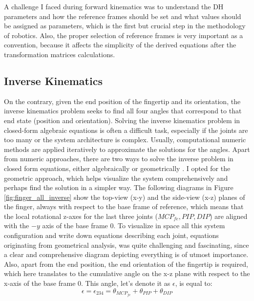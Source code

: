 \documentclass[a4paper,12pt]{article}
\begin{document}
A challenge I faced during forward kinematics was to understand the DH parameters and how the reference frames should be set and what values should be assigned as parameters, which is the first but crucial step in the methodology of robotics. Also, the proper selection of reference frames is very important as a convention, because it affects the simplicity of the derived equations after the transformation matrices calculations.


\subsection{Inverse Kinematics}
On the contrary, given the end position of the fingertip and its orientation, the inverse kinematics problem seeks to find all four angles that correspond to that end state (position and orientation). Solving the inverse kinematics problem in closed-form algebraic equations is often a difficult task, especially if the joints are too many or the system architecture is complex. Usually, computational numeric methods are applied iteratively to approximate the solutions for the angles. Apart from numeric approaches, there are two ways to solve the inverse problem in closed form equations, either algebraically or geometrically \cite{craig2009introduction, CheckValidAngles_BEST_chen2013constraint, BEST_li2022kinematic, chavdarov2022algorithm, nunez2015design}. I opted for the geometric approach, which helps visualize the system comprehensively and perhaps find the solution in a simpler way. The following diagrams in Figure \ref{fig:finger_all_inverse} show the top-view (x-y) and the side-view (x-z) planes of the finger, always with respect to the base frame of reference, which means that the local rotational z-axes for the last three joints ($MCP_{fe}, PIP, DIP$) are aligned with the $-y$ axis of the base frame 0. To visualize in space all this system configuration and write down equations describing each joint, equations originating from geometrical analysis, was quite challenging and fascinating, since a clear and comprehensive diagram depicting everything is of utmost importance. Also, apart from the end position, the end orientation of the fingertip is required, which here translates to the cumulative angle on the x-z plane with respect to the x-axis of the base frame 0. This angle, let's denote it as $\epsilon$, is equal to:\\
\begin{equation}
    \epsilon = \epsilon_{234} = \theta_{MCP_{fe}} + \theta_{PIP} + \theta_{DIP}
\end{equation}
\end{document}

